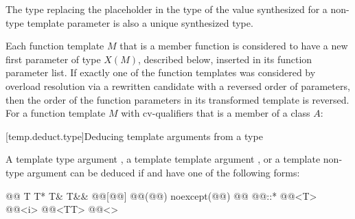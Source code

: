\documentclass{wg21}
\begin{document}
\begin{note}
    The type replacing the placeholder
    in the type of the value synthesized for a non-type template parameter
    is also a unique synthesized type.
\end{note}
Each function template $M$ that is a member function
is considered to have
a new first parameter of type $X(M)$, described below,
inserted in its function parameter list.
If exactly one of the function templates was considered by overload resolution
via a rewritten candidate
with a reversed order of parameters,
then the order of the function parameters in its transformed template
is reversed.
For a function template $M$ with cv-qualifiers \cv{}
that is a member of a class $A$:


[temp.deduct.type]{Deducing template arguments from a type}


\pnum
A template type argument
,
a template template argument 
,
or a template non-type argument
can be deduced if
and
have one of the following forms:
\begin{codeblock}
    @\opt{\cv{}}@ T
    T*
    T&
    T&&
    @@[@@]
    @@(@@) noexcept(@@)
    @@ @@::*
    @@<T>
    @@<i>
    @@<TT>
    @@<>
\end{codeblock}






\renewcommand{\section}[2]{}%

\begin{thebibliography}{9}


\end{thebibliography}
\end{document}
